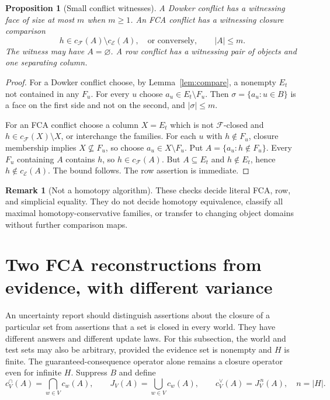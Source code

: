 \documentclass[11pt]{article}
\newtheorem{proposition}[theorem]{Proposition}
\theoremstyle{definition}
\newtheorem{remark}[theorem]{Remark}
\begin{document}
\begin{proposition}[Small conflict witnesses]\label{prop:small}
A Dowker conflict has a witnessing face of size at most $m$ when $m\ge1$. An FCA conflict has a witnessing closure comparison
\[
 h\in c_{\mathcal F}(A)\setminus c_{\mathcal E}(A),\quad\text{or conversely},\qquad |A|\le m.
\]
The witness may have $A=\varnothing$. A row conflict has a witnessing pair of objects and one separating column.
\end{proposition}
\begin{proof}
For a Dowker conflict choose, by Lemma~\ref{lem:compare}, a nonempty $E_t$ not contained in any $F_u$. For every $u$ choose $a_u\in E_t\setminus F_u$. Then $\sigma=\{a_u:u\in B\}$ is a face on the first side and not on the second, and $|\sigma|\le m$.

For an FCA conflict choose a column $X=E_t$ which is not $\mathcal F$-closed and $h\in c_{\mathcal F}(X)\setminus X$, or interchange the families. For each $u$ with $h\notin F_u$, closure membership implies $X\nsubseteq F_u$, so choose $a_u\in X\setminus F_u$. Put $A=\{a_u:h\notin F_u\}$. Every $F_u$ containing $A$ contains $h$, so $h\in c_{\mathcal F}(A)$. But $A\subseteq E_t$ and $h\notin E_t$, hence $h\notin c_{\mathcal E}(A)$. The bound follows. The row assertion is immediate.
\end{proof}

\begin{remark}[Not a homotopy algorithm]
These checks decide literal FCA, row, and simplicial equality. They do not decide homotopy equivalence, classify all maximal homotopy-conservative families, or transfer to changing object domains without further comparison maps.
\end{remark}



\section{Two FCA reconstructions from evidence, with different variance}
An uncertainty report should distinguish assertions about the closure of a particular set from assertions that a set is closed in every world. They have different answers and different update laws. For this subsection, the world and test sets may also be arbitrary, provided the evidence set is nonempty and $H$ is finite. The guaranteed-consequence operator alone remains a closure operator even for infinite $H$. Suppress $B$ and define
\[
 c^{\cap}_V(A)=\bigcap_{w\in V}c_w(A),\qquad
 J_V(A)=\bigcup_{w\in V}c_w(A),\qquad
 c^{\vee}_V(A)=J_V^{\,n}(A),\quad n=|H|.
\]
\end{document}
